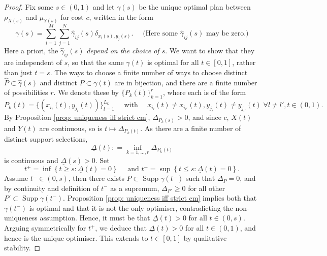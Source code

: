 \documentclass[10pt,a4paper]{amsart}
\DeclareMathOperator{\supp}{Supp}
\begin{document}
\begin{proof}
Fix some $s \in (0, 1)$ and let $\gamma(s)$ be the unique optimal plan between $\rho_{X(s)}$ and $\mu_{Y(s)}$ for cost $c$, written in the form
\begin{equation}
\label{eq: gamma(s) definion}
    \gamma(s) = \sum_{i = 1}^{M}\sum_{j=1}^N \hat\gamma_{ij}(s) \delta_{x_i(s), y_j(s)}. \quad \text{ (Here some $\hat\gamma_{ij}(s)$ may be zero.)}
\end{equation}
Here a priori, the $\hat\gamma_{ij}(s)$ \textit{depend on the choice of $s$}. We want to show that they are independent of $s$, so that the same $\gamma(t)$ is optimal for all  $t \in [0, 1]$, rather than just $t = s$. The ways to choose a finite number of ways to choose distinct $\hat P \subset \hat\gamma(s)$ and distinct $P \subset \gamma(t)$ are in bijection, and there are a finite number of possibilities $r$. We denote these by $\{P_k(t)\}_{k=1}^r$, where each is of the form
\begin{equation*}
    P_k(t) = \{(x_{i_l}(t), y_{j_l}(t))\}_{l=1}^{L_k} \quad \text{ with }\quad x_{i_{l}}(t) \neq x_{i_{l'}}(t), y_{j_l}(t) \neq y_{j_{l'}}(t)\; \forall l \neq l', t \in (0, 1).
\end{equation*}
By Proposition \ref{prop: uniqueness iff strict cm}, $\Delta_{P_k(s)} >0$, and since $c$, $X(t)$ and $Y(t)$ are continuous, so is $t \mapsto \Delta_{P_k(t)}$. As there are a finite number of distinct support selections,
\begin{equation*}
    \underline{\Delta}(t) : = \inf_{k = 1,..., r} \Delta_{P_k(t)}
\end{equation*}
is continuous and $\underline{\Delta}(s)>0$. Set
\begin{equation*}
    t^+ = \inf \left\{ t \geq s : \underline{\Delta}(t) = 0 \right\} \quad \text{ and } t^- = \sup\left\{t \leq s : \underline{\Delta}(t) = 0\right\}.
\end{equation*}
Assume $t^- \in (0, s)$, then there exists $P \subset \supp \gamma(t^-)$ such that $\Delta_P = 0$, and by continuity and definition of $t^-$ as a supremum, $\Delta_{P'} \geq 0$ for all other $P' \subset \supp \gamma(t^-)$. Proposition \ref{prop: uniqueness iff strict cm} implies both that $\gamma(t^-)$ is optimal and that it is not the only optimiser, contradicting the non-uniqueness assumption. Hence, it must be that $\underline{\Delta}(t) > 0$ for all $t \in (0,s)$. Arguing symmetrically for $t^+$, we deduce that $\underline{\Delta}(t) > 0$ for all $t \in (0,1)$, and hence is the unique optimiser. This extends to $t \in [0, 1]$ by qualitative stability.


\end{proof}
\end{document}
